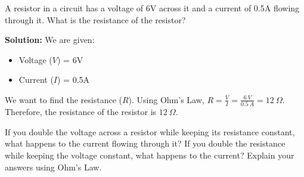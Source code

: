 \begin{example}
A resistor in a circuit has a voltage of 6V across it and a current of 0.5A flowing through it. What is the resistance of the resistor?

\textbf{Solution:}
We are given:
\begin{itemize}
    \item Voltage ($V$) = 6V
    \item Current ($I$) = 0.5A
\end{itemize}
We want to find the resistance ($R$). Using Ohm's Law, $R = \frac{V}{I} = \frac{6\ V}{0.5\ A} = 12\ \Omega$.
Therefore, the resistance of the resistor is $12\ \Omega$.
\end{example}

\begin{stopandthink}
If you double the voltage across a resistor while keeping its resistance constant, what happens to the current flowing through it?  If you double the resistance while keeping the voltage constant, what happens to the current? Explain your answers using Ohm's Law.
\end{stopandthink}

